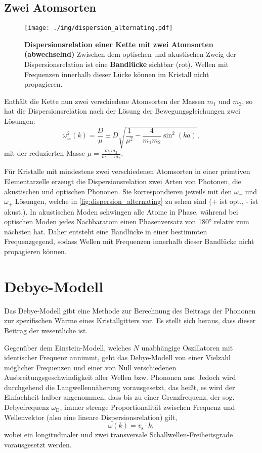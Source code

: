 \subsection{Zwei Atomsorten}
\begin{figure}[tbp]
	\centering
	\texttt{[image: ./img/dispersion\_alternating.pdf]}
	\caption{\textbf{Dispersionsrelation einer Kette mit zwei Atomsorten (abwechselnd)} Zwischen dem optischen und akustischen Zweig der Dispersionsrelation ist eine \textbf{Bandlücke} sichtbar (rot). Wellen mit Frequenzen innerhalb dieser Lücke können im Kristall nicht propagieren.}
	\label{fig:dispersion_alternating}
\end{figure}
Enthält die Kette nun zwei verschiedene Atomsorten der Massen $m_1$ und $m_2$, so hat die Dispersionsrelation nach der Lösung der Bewegungsgleichungen zwei Lösungen:
\begin{equation}
	\omega_\pm^2(k) = \frac{D}{\mu} \pm D\sqrt{\frac{1}{\mu^2} - \frac{4}{m_1 m_2}\sin^2\left(k a\right)},
\end{equation}
mit der reduzierten Masse $\mu = \frac{m_1 m_2}{m_1 + m_2}$.

Für Kristalle mit mindestens zwei verschiedenen Atomsorten in einer primtiven Elementarzelle erzeugt die Dispersionsrelation zwei Arten von Photonen, die akustischen und optischen Phononen.
Sie korrespondieren jeweils mit den $\omega_{-}$ und $\omega_{+}$ Lösungen, welche in \autoref{fig:dispersion_alternating} zu sehen sind (+ ist opt., - ist akust.).
In akustischen Moden schwingen alle Atome in Phase, während bei optischen Moden jedes Nachbaratom einen Phasenversatz von 180° relativ zum nächsten hat.
Daher entsteht eine Bandlücke in einer bestimmten Frequenzgegend, sodass Wellen mit Frequenzen innerhalb dieser Bandlücke nicht propagieren können.

\section{Debye-Modell}
Das Debye-Modell gibt eine Methode zur Berechnung des Beitrags der Phononen zur spezifischen Wärme eines Kristallgitters vor.
Es stellt sich heraus, dass dieser Beitrag der wesentliche ist.

Gegenüber dem Einstein-Modell, welches $N$ unabhängige Oszillatoren mit identischer Frequenz annimmt, geht das Debye-Modell von einer Vielzahl möglicher Frequenzen und einer von Null verschiedenen Ausbreitungsgeschwindigkeit aller Wellen bzw. Phononen aus.
Jedoch wird durchgehend die Langwellennäherung vorausgesetzt, das heißt, es wird der Einfachheit halber angenommen, dass bis zu einer Grenzfrequenz, der sog. Debyefrequenz $\omega_\text{D}$, immer strenge Proportionalität zwischen Frequenz und Wellenvektor (also eine lineare Dispersionsrelation) gilt,
\begin{equation*}
	\omega(k) = v_\text{s}\cdot k,
\end{equation*}
wobei ein longitudinaler und zwei transversale Schallwellen-Freiheitsgrade vorausgesetzt werden.

